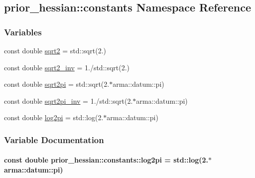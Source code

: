 \hypertarget{namespaceprior__hessian_1_1constants}{}\subsection{prior\+\_\+hessian\+:\+:constants Namespace Reference}
\label{namespaceprior__hessian_1_1constants}
\subsubsection*{Variables}
\begin{DoxyCompactItemize}
\item 
const double \hyperlink{namespaceprior__hessian_1_1constants_aa1b2e54868f0913edd62e8029b829c43}{sqrt2} = std\+::sqrt(2.)
\item 
const double \hyperlink{namespaceprior__hessian_1_1constants_a083a6193aeb4fb1a3b244a132d25e1e3}{sqrt2\+\_\+inv} = 1./std\+::sqrt(2.)
\item 
const double \hyperlink{namespaceprior__hessian_1_1constants_a575039e0e575a200b1ba202c452ecbad}{sqrt2pi} = std\+::sqrt(2.$\ast$arma\+::datum\+::pi)
\item 
const double \hyperlink{namespaceprior__hessian_1_1constants_a7a6ae61175a9b764667984ec36da24bd}{sqrt2pi\+\_\+inv} = 1./std\+::sqrt(2.$\ast$arma\+::datum\+::pi)
\item 
const double \hyperlink{namespaceprior__hessian_1_1constants_a5a87faeb38eaf97a75f4d112cdaa4a8d}{log2pi} = std\+::log(2.$\ast$arma\+::datum\+::pi)
\end{DoxyCompactItemize}


\subsubsection{Variable Documentation}
\paragraph[{\texorpdfstring{log2pi}{log2pi}}]{\setlength{\rightskip}{0pt plus 5cm}const double prior\+\_\+hessian\+::constants\+::log2pi = std\+::log(2.$\ast$arma\+::datum\+::pi)}\hypertarget{namespaceprior__hessian_1_1constants_a5a87faeb38eaf97a75f4d112cdaa4a8d}{}\label{namespaceprior__hessian_1_1constants_a5a87faeb38eaf97a75f4d112cdaa4a8d}



